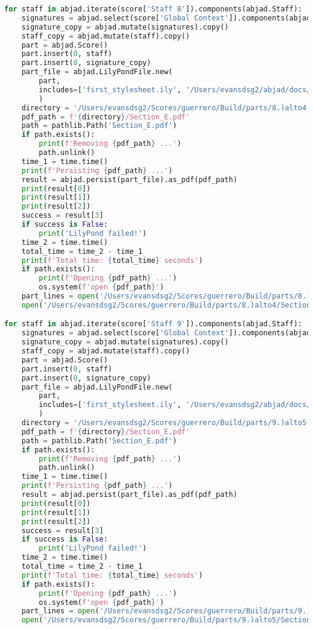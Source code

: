 \begin{lstlisting}[language=Python, caption=Invocation Source Code]
for staff in abjad.iterate(score['Staff 8']).components(abjad.Staff):
    signatures = abjad.select(score['Global Context']).components(abjad.Staff)
    signature_copy = abjad.mutate(signatures).copy()
    staff_copy = abjad.mutate(staff).copy()
    part = abjad.Score()
    part.insert(0, staff)
    part.insert(0, signature_copy)
    part_file = abjad.LilyPondFile.new(
        part,
        includes=['first_stylesheet.ily', '/Users/evansdsg2/abjad/docs/source/_stylesheets/abjad.ily'],
        )
    directory = '/Users/evansdsg2/Scores/guerrero/Build/parts/8.)alto4'
    pdf_path = f'{directory}/Section_E.pdf'
    path = pathlib.Path('Section_E.pdf')
    if path.exists():
        print(f'Removing {pdf_path} ...')
        path.unlink()
    time_1 = time.time()
    print(f'Persisting {pdf_path} ...')
    result = abjad.persist(part_file).as_pdf(pdf_path)
    print(result[0])
    print(result[1])
    print(result[2])
    success = result[3]
    if success is False:
        print('LilyPond failed!')
    time_2 = time.time()
    total_time = time_2 - time_1
    print(f'Total time: {total_time} seconds')
    if path.exists():
        print(f'Opening {pdf_path} ...')
        os.system(f'open {pdf_path}')
    part_lines = open('/Users/evansdsg2/Scores/guerrero/Build/parts/8.)alto4/Section_E.ly').readlines()
    open('/Users/evansdsg2/Scores/guerrero/Build/parts/8.)alto4/Section_E.ly', 'w').writelines(part_lines[15:-1])

for staff in abjad.iterate(score['Staff 9']).components(abjad.Staff):
    signatures = abjad.select(score['Global Context']).components(abjad.Staff)
    signature_copy = abjad.mutate(signatures).copy()
    staff_copy = abjad.mutate(staff).copy()
    part = abjad.Score()
    part.insert(0, staff)
    part.insert(0, signature_copy)
    part_file = abjad.LilyPondFile.new(
        part,
        includes=['first_stylesheet.ily', '/Users/evansdsg2/abjad/docs/source/_stylesheets/abjad.ily'],
        )
    directory = '/Users/evansdsg2/Scores/guerrero/Build/parts/9.)alto5'
    pdf_path = f'{directory}/Section_E.pdf'
    path = pathlib.Path('Section_E.pdf')
    if path.exists():
        print(f'Removing {pdf_path} ...')
        path.unlink()
    time_1 = time.time()
    print(f'Persisting {pdf_path} ...')
    result = abjad.persist(part_file).as_pdf(pdf_path)
    print(result[0])
    print(result[1])
    print(result[2])
    success = result[3]
    if success is False:
        print('LilyPond failed!')
    time_2 = time.time()
    total_time = time_2 - time_1
    print(f'Total time: {total_time} seconds')
    if path.exists():
        print(f'Opening {pdf_path} ...')
        os.system(f'open {pdf_path}')
    part_lines = open('/Users/evansdsg2/Scores/guerrero/Build/parts/9.)alto5/Section_E.ly').readlines()
    open('/Users/evansdsg2/Scores/guerrero/Build/parts/9.)alto5/Section_E.ly', 'w').writelines(part_lines[15:-1])


\end{lstlisting}
